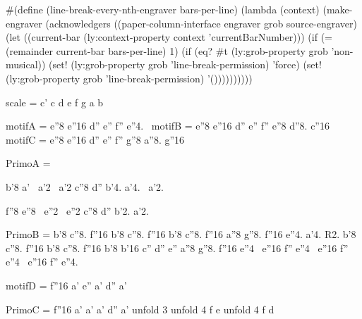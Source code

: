 #(define (line-break-every-nth-engraver bars-per-line) 
  (lambda (context) 
     (make-engraver 
       (acknowledgers ((paper-column-interface engraver grob source-engraver) 
         (let ((current-bar (ly:context-property context 'currentBarNumber))) 
           (if (= (remainder current-bar bars-per-line) 1) 
               (if (eq? #t (ly:grob-property grob 'non-musical)) 
                   (set! (ly:grob-property grob 'line-break-permission) 'force) 
                   (set! (ly:grob-property grob 'line-break-permission) '())))))))))




scale = \relative c' { c d e f g a b }

motifA = { e''8 e''16 d'' e'' f'' e''4.~ }
motifB = { e''8 e''16 d'' e'' f'' e''8 d''8. c''16 }
motifC = { e''8 e''16 d'' e'' f'' g''8 a''8. g''16 }

PrimoA = {
  \motifA
  \motifB
  b'8 a'~ a'2~
  a'2 c''8 d''
  \motifA
  \motifB
  b'4. a'4.~
  a'2.

  \motifA
  \motifC
  f''8 e''8~ e''2~
  e''2 c''8 d''
  \motifA
  \motifB
  b'2.
  a'2.
}

PrimoB = {
  b'8 c''8. f''16 b'8 c''8. f''16
  b'8 c''8. f''16 a''8 g''8. f''16
  e''4. a'4.
  R2.
  b'8 c''8. f''16 b'8 c''8. f''16
  b'8 b'16 c'' d'' e'' a''8 g''8. f''16
  e''4~ e''16 f'' e''4~ e''16 f''
  e''4~ e''16 f'' e''4.
}

motifD = { f''16 a' e'' a' d'' a' }

PrimoC = {
  f''16 a' a' a' d'' a'
  \repeat unfold 3 { \motifD }
  \repeat unfold 4 { \modalTranspose f e \scale \motifD }
  \repeat unfold 4 { \modalTranspose f d \scale \motifD }
}

